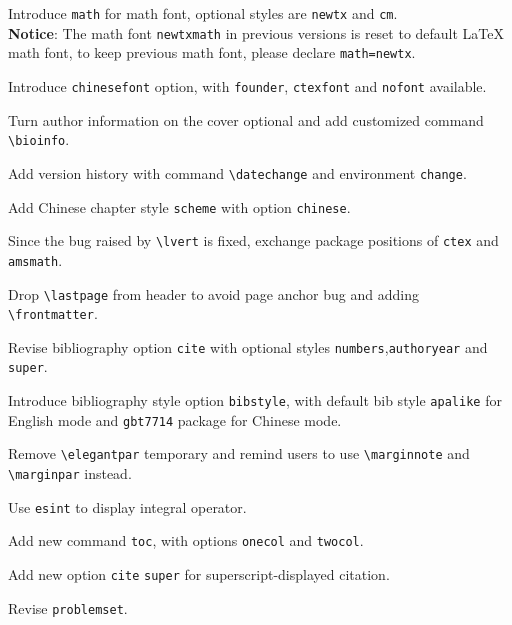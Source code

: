 \documentclass[11pt,bibend=bibtex]{elegantbook}
\begin{document}
\begin{change}
  \item Introduce \lstinline{math} for math font, optional styles are \lstinline{newtx} and \lstinline{cm}.\\
  \textbf{Notice}: The math font \lstinline{newtxmath} in previous versions is reset to default \LaTeX{} math font, to keep previous math font, please declare \lstinline{math=newtx}.
  \item Introduce \lstinline{chinesefont} option, with \lstinline{founder}, \lstinline{ctexfont} and \lstinline{nofont} available.
  \item Turn author information on the cover optional and add customized command \lstinline{\bioinfo}.
  \item Add version history with command \lstinline{\datechange} and environment \lstinline{change}.
  \item Add Chinese chapter style \lstinline{scheme} with option \lstinline{chinese}.
  \item Since the bug raised by \lstinline{\lvert} is fixed, exchange package positions of \lstinline{ctex} and \lstinline{amsmath}.
  \item Drop \lstinline{\lastpage} from header to avoid page anchor bug and adding \lstinline{\frontmatter}.
  \item Revise bibliography option \lstinline{cite} with optional styles \lstinline{numbers},\lstinline{authoryear} and \lstinline{super}.
  \item Introduce bibliography style option \lstinline{bibstyle}, with default bib style \lstinline{apalike} for English mode and \lstinline{gbt7714} package for Chinese mode.
\end{change}


\begin{change}
  \item Remove \lstinline{\elegantpar} temporary and remind users to use \lstinline{\marginnote} and \lstinline{\marginpar} instead.
  \item Use \lstinline{esint} to display integral operator.
  \item Add new command \lstinline{toc}, with options  \lstinline{onecol} and \lstinline{twocol}.
  \item Add new option \lstinline{cite} \lstinline{super} for superscript-displayed citation.
  \item Revise \lstinline{problemset}.
\end{change}
\end{document}
